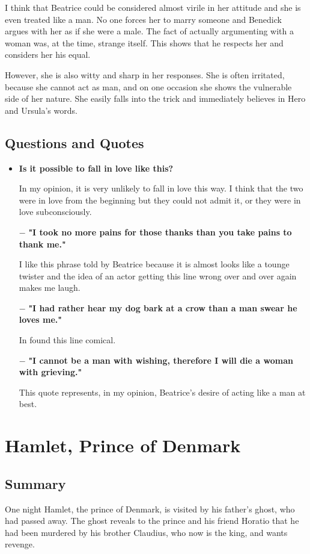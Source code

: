 \documentclass[]{article}
\begin{document}
I think that Beatrice could be considered almost virile in her attitude and she is even treated like a man. No one forces her to marry someone and Benedick argues with her as if she were a male. The fact of actually argumenting with a woman was, at the time, strange itself. This shows that he respects her and considers her his equal.

However, she is also witty and sharp in her responses. She is often irritated, because she cannot act as man, and on one occasion she shows the vulnerable side of her nature. She easily falls into the trick and immediately believes in Hero and Ursula's words.

\subsection*{Questions and Quotes}
\vspace{1em}
\begin{itemize}
    \item \textbf{Is it possible to fall in love like this?} \par
        In my opinion, it is very unlikely to fall in love this way. I think that the two were in love from the beginning but they could not admit it, or they were in love subconsciously.
    \item[$-$] \textbf{"I took no more pains for those thanks than you take pains to thank me."} \par
        I like this phrase told by Beatrice because it is almost looks like a tounge twister and the idea of an actor getting this line wrong over and over again makes me laugh. 
    \item[$-$] \textbf{"I had rather hear my dog bark at a crow than a man swear he loves me."} \par
        In found this line comical.
    \item[$-$] \textbf{"I cannot be a man with wishing, therefore I will die a woman with grieving."} \par
        This quote represents, in my opinion, Beatrice's desire of acting like a man at best.
\end{itemize}

\newpage
\section{Hamlet, Prince of Denmark}
\subsection*{Summary}
\hspace{1em}
One night Hamlet, the prince of Denmark, is visited by his father's ghost, who had passed away. The ghost reveals to the prince and his friend Horatio that he had been murdered by his brother Claudius, who now is the king, and wants revenge.
\end{document}

